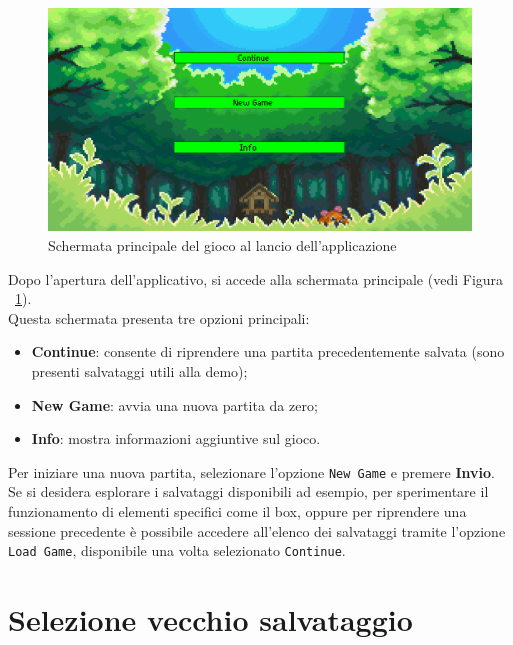 \documentclass[a4paper,12pt]{report}
\begin{document}
{{\begin{figure}[H]
  \centering
  \includegraphics[width=\textwidth]{immagini/scermataHome.png}
  \caption{Schermata principale del gioco al lancio dell'applicazione}
    \label{fig:scermataHome}

\end{figure}

Dopo l’apertura dell’applicativo, si accede alla schermata principale (vedi Figura ~\ref{fig:scermataHome}).\\
Questa schermata presenta tre opzioni principali:

\begin{itemize}
  \item \textbf{Continue}: consente di riprendere una partita precedentemente salvata (sono presenti salvataggi utili alla demo);
  \item \textbf{New Game}: avvia una nuova partita da zero;
  \item \textbf{Info}: mostra informazioni aggiuntive sul gioco.
\end{itemize}

Per iniziare una nuova partita, selezionare l’opzione \texttt{New Game} e premere \textbf{Invio}.\\
Se si desidera esplorare i salvataggi disponibili ad esempio, per sperimentare il funzionamento di elementi specifici come il box, oppure per riprendere una sessione precedente è possibile accedere all’elenco dei salvataggi tramite l’opzione \texttt{Load Game}, disponibile una volta selezionato \texttt{Continue}.


\section{Selezione vecchio salvataggio}

}}
\end{document}
